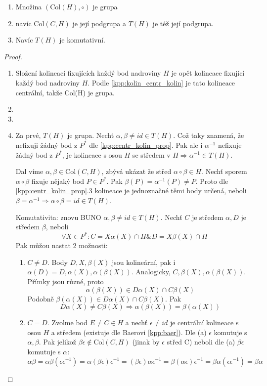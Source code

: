 \begin{theorem}\label{kpp:kolin_group}
	\begin{enumerate}
		\item Množina $(\mathrm{Col}(H), \circ)$ je grupa
		\item navíc $\mathrm{Col}(C,H)$ je její podgrupa a $T(H)$ je též její podgrupa.
		\item Navíc $T(H)$ je komutativní.
	\end{enumerate}
\end{theorem}
\begin{proof}~
	\begin{enumerate}
		\item Složení kolineací fixujících každý bod nadroviny $H$ je opět kolineace fixující každý bod nadroviny $H$.
	 Podle \cref{kpp:kolin_centr_kolin} je tato kolineace centrální, takže Col(H) je grupa.
 		\item
 		\item
		\item Za prvé, $T(H)$ je grupa. Nechť $\alpha, \beta \ne id \in T(H)$.
			Což taky znamená, že nefixuji žádný bod z $P^*$ dle \cref{kpp:centr_kolin_prop}.
			Pak ale i $\alpha^{-1}$ nefixuje žádný bod z $P^*$, je kolineace s osou $H$ se středem v $H \Rightarrow \alpha^{-1} \in T(H)$.

			Dal víme $\alpha, \beta \in \mathrm{Col}(C,H)$, zbývá ukázat že střed $\alpha \circ \beta \in H$.
			Nechť sporem $\alpha \circ \beta$ fixuje nějaký bod $P \in P^*$.
			Pak $\beta(P) = \alpha^{-1}(P) \ne P$.
			Proto dle \cref{kpp:centr_kolin_prop}.3 kolineace je jednoznačné těmi body určená, neboli $\beta = \alpha^{-1} \Rightarrow \alpha \circ \beta = id \in T(H)$.

			Komutativita: znovu BUNO $\alpha, \beta \ne id \in T(H)$.
			Nechť $C$ je středem $\alpha, D$ je středem $\beta$, neboli
			\[ \forall X \in P^*: C = X\alpha(X) \cap H \& D = X\beta(X) \cap H \]
			Pak můžou nastat 2 možnosti:
			\begin{enumerate}
				\item $C \ne D$. Body $D, X, \beta(X)$ jsou kolineární, pak i $\alpha(D) = D, \alpha(X), \alpha(\beta(X))$.
					Analogicky, $C, \beta(X), \alpha(\beta(X))$. Přímky jsou různé, proto
					\[ \alpha(\beta(X)) \in D\alpha(X) \cap C\beta(X) \]
					Podobně $\beta(\alpha(X)) \in D\alpha(X) \cap C\beta(X)$.
					Pak
					\[ D\alpha(X) \ne C\beta(X) \Rightarrow \alpha(\beta(X)) = \beta(\alpha(X)) \]
				\item $C = D$. Zvolme bod $E \ne C \in H$ a nechť $\epsilon \ne id$ je centrální kolineace s osou $H$ a středem (existuje dle Baerovi \cref{kpp:baer}).
					Dle (a) $\epsilon$ komutuje s $\alpha, \beta$.
					Pak jelikož $\beta\epsilon \notin \mathrm{Col}(C,H)$ (jinak by $\epsilon$ střed C) neboli dle (a) $\beta \epsilon$ komutuje s $\alpha$:
					\[ \alpha\beta = \alpha\beta(\epsilon\epsilon^{-1}) = \alpha(\beta\epsilon)\epsilon^{-1} = (\beta\epsilon)\alpha\epsilon^{-1} = \beta(\alpha\epsilon)\epsilon^{-1} = \beta\alpha (\epsilon\epsilon^{-1}) = \beta \alpha \]
			\end{enumerate}
	\end{enumerate}
\end{proof}

